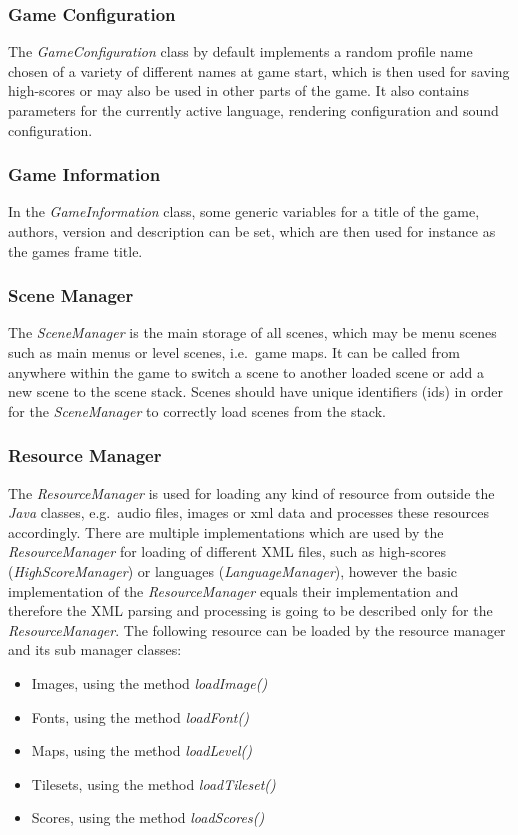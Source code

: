 \subsubsection{Game Configuration}\label{subsubsec:game-configuration}
The \textit{GameConfiguration} class by default implements a random profile name chosen of a variety of different names at game start, which is then used for saving high-scores
or may also be used in other parts of the game.
It also contains parameters for the currently active language, rendering configuration and sound configuration.

\subsubsection{Game Information}\label{subsubsec:game-information}
In the \textit{GameInformation} class, some generic variables for a title of the game, authors, version and description can be set, which are then used for instance as the games frame
title.

\subsubsection{Scene Manager}\label{subsubsec:scene-manager}
The \textit{SceneManager} is the main storage of all scenes, which may be menu scenes such as main menus or level scenes, i.e.\ game maps.
It can be called from anywhere within the game to switch a scene to another loaded scene or add a new scene to the scene stack.
Scenes should have unique identifiers (ids) in order for the \textit{SceneManager} to correctly load scenes from the stack.
\subsubsection{Resource Manager}\label{subsubsec:resource-manager}
The \textit{ResourceManager} is used for loading any kind of resource from outside the \textit{Java} classes, e.g.\ audio files, images or xml data and processes
these resources accordingly.
There are multiple implementations which are used by the \textit{ResourceManager} for loading of different \gls{XML} files,
such as high-scores (\textit{HighScoreManager}) or languages (\textit{LanguageManager}),
however the basic implementation of the \textit{ResourceManager} equals their implementation and therefore the \gls{XML}
parsing and processing is going to be described only for the \textit{ResourceManager}.
The following resource can be loaded by the resource manager and its sub manager classes:
\begin{itemize}
    \item Images, using the method \textit{loadImage()}
    \item Fonts, using the method \textit{loadFont()}
    \item Maps, using the method \textit{loadLevel()}
    \item Tilesets, using the method \textit{loadTileset()}
    \item Scores, using the method \textit{loadScores()}
\end{itemize}

